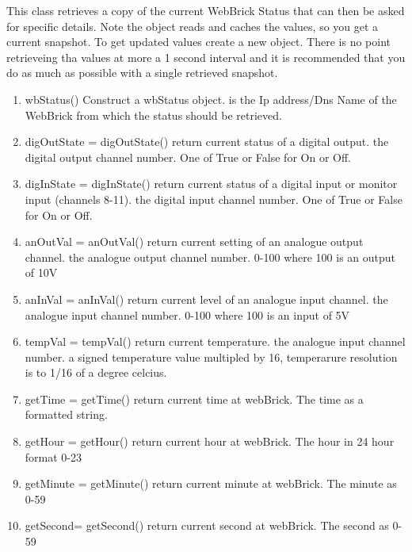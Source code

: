 This class retrieves a copy of the current WebBrick Status that can then be asked for specific details. Note
the object reads and caches the values, so you get a current snapshot. To get updated values create a new object.
There is no point retrieveing tha values at more a 1 second interval and it is recommended that you do as much as possible
with a single retrieved snapshot.

\begin{enumerate}
\item wbStatus() Construct a wbStatus object.
         is the Ip address/Dns Name of the WebBrick from which the status should be retrieved.

\item digOutState = digOutState() return current status of a digital output.
          the digital output channel number.
          One of True or False for On or Off.
\item digInState = digInState() return current status of a digital input or monitor input (channels 8-11).
          the digital input channel number.
          One of True or False for On or Off.
\item anOutVal = anOutVal() return current setting of an analogue output channel.
          the analogue output channel number.
          0-100 where 100 is an output of 10V
\item anInVal = anInVal() return current level of an analogue input channel.
          the analogue input channel number.
          0-100 where 100 is an input of 5V
\item tempVal = tempVal() return current temperature.
          the analogue input channel number.
          a signed temperature value multipled by 16, temperarure resolution is to 1/16 of a degree celcius.
\item getTime = getTime() return current time at webBrick.
          The time as a formatted string.
\item getHour = getHour() return current hour at webBrick.
          The hour in 24 hour format 0-23
\item getMinute = getMinute() return current minute at webBrick.
          The minute as 0-59
\item getSecond= getSecond() return current second at webBrick.
          The second as 0-59

\end{enumerate}

